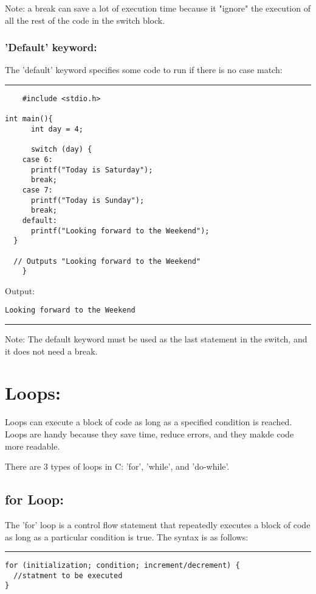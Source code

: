 \documentclass[a4paper]{article}
\begin{document}
Note: a break can save a lot of execution time because it "ignore" the execution
of all the rest of the code in the switch block.
\subsubsection{'Default' keyword:}
\label{sec:orgd956a02}
The 'default' keyword specifies some code to run if there is no case match:

\noindent\rule{\textwidth}{0.5pt}
\begin{verbatim}
    #include <stdio.h>

int main(){
      int day = 4;

      switch (day) {
    case 6:
      printf("Today is Saturday");
      break;
    case 7:
      printf("Today is Sunday");
      break;
    default:
      printf("Looking forward to the Weekend");
  }

  // Outputs "Looking forward to the Weekend"
    }
\end{verbatim}
Output:
\begin{verbatim}
Looking forward to the Weekend
\end{verbatim}

\noindent\rule{\textwidth}{0.5pt}
Note: The default keyword must be used as the last statement in the switch, and
it does not need a break.

\section{Loops:}
\label{sec:org0767082}
Loops can execute a block of code as long as a specified condition is reached.
Loops are handy because they save time, reduce errors, and they makde code more
readable.

There are 3 types of loops in C: 'for', 'while', and 'do-while'.

\subsection{for Loop:}
\label{sec:org419e7f5}
The 'for' loop is a control flow statement that repeatedly executes a block of
code as long as a particular condition is true. The syntax is as follows:

\noindent\rule{\textwidth}{0.5pt}
\begin{verbatim}
for (initialization; condition; increment/decrement) {
  //statment to be executed
}
\end{verbatim}
\end{document}
